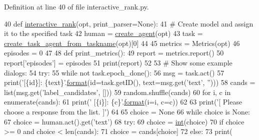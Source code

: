 Definition at line 40 of file interactive\+\_\+rank.\+py.


\begin{DoxyCode}
40 \textcolor{keyword}{def }\hyperlink{namespaceparlai_1_1scripts_1_1interactive__rank_a9997f1d0eba4a72a45a773ec05874af3}{interactive\_rank}(opt, print\_parser=None):
41     \textcolor{comment}{# Create model and assign it to the specified task}
42     human = \hyperlink{namespaceparlai_1_1core_1_1agents_a00d77a7e26fb89e8bd900f7b2a02982a}{create\_agent}(opt)
43     task = \hyperlink{namespaceparlai_1_1core_1_1agents_a76269fb567532a8fb7f29edcc20a6e47}{create\_task\_agent\_from\_taskname}(opt)[0]
44 
45     metrics = Metrics(opt)
46     episodes = 0
47 
48     \textcolor{keyword}{def }print\_metrics():
49         report = metrics.report()
50         report[\textcolor{stringliteral}{'episodes'}] = episodes
51         print(report)
52 
53     \textcolor{comment}{# Show some example dialogs:}
54     \textcolor{keywordflow}{try}:
55         \textcolor{keywordflow}{while} \textcolor{keywordflow}{not} task.epoch\_done():
56             msg = task.act()
57             print(\textcolor{stringliteral}{'[\{id\}]: \{text\}'}.\hyperlink{namespaceparlai_1_1chat__service_1_1services_1_1messenger_1_1shared__utils_a32e2e2022b824fbaf80c747160b52a76}{format}(id=task.getID(), text=msg.get(\textcolor{stringliteral}{'text'}, \textcolor{stringliteral}{''})))
58             cands = list(msg.get(\textcolor{stringliteral}{'label\_candidates'}, []))
59             random.shuffle(cands)
60             \textcolor{keywordflow}{for} i, c \textcolor{keywordflow}{in} enumerate(cands):
61                 print(\textcolor{stringliteral}{'    [\{i\}]: \{c\}'}.\hyperlink{namespaceparlai_1_1chat__service_1_1services_1_1messenger_1_1shared__utils_a32e2e2022b824fbaf80c747160b52a76}{format}(i=i, c=c))
62 
63             print(\textcolor{stringliteral}{'[ Please choose a response from the list. ]'})
64 
65             choice = \textcolor{keywordtype}{None}
66             \textcolor{keywordflow}{while} choice \textcolor{keywordflow}{is} \textcolor{keywordtype}{None}:
67                 choice = human.act().get(\textcolor{stringliteral}{'text'})
68                 \textcolor{keywordflow}{try}:
69                     choice = \hyperlink{namespacelanguage__model_1_1eval__ppl_a7d12ee00479673c5c8d1f6d01faa272a}{int}(choice)
70                     \textcolor{keywordflow}{if} choice >= 0 \textcolor{keywordflow}{and} choice < len(cands):
71                         choice = cands[choice]
72                     \textcolor{keywordflow}{else}:
73                         print(

\end{DoxyCode}

